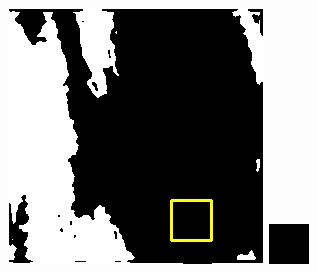 \documentclass[10pt,UTF8,fntef]{ctexart}
\begin{document}
\begin{figure}[H]
{{\begin{minipage}[b]{0.15\linewidth}
            \includegraphics[width=1\linewidth]{../log/spoon3/cut/LC81321192014054LGN00_03249_unet.jpg}\vspace{4pt}
            \includegraphics[width=1\linewidth]{../log/spoon3/cut/tmp_cut_LC81321192014054LGN00_03249_unet.jpg}\vspace{4pt}

\end{minipage}}}
\end{figure}
\end{document}
